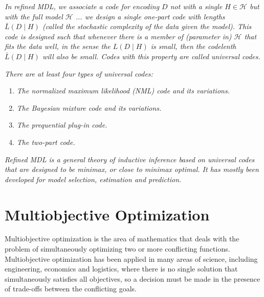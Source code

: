 {\emph{In refined MDL, we associate a code for encoding $D$ not with
    a single $H\in\mathcal{H}$ but with the full model $\mathcal{H}$
    ... we design a single one-part code with lengths $\bar{L}\left(D\mid H\right)$
    (called the stochastic complexity of the data given the model). This
    code is designed such that whenever there is a member of (parameter
    in) $\mathcal{H}$ that fits the data well, in the sense the $L\left(D\mid H\right)$
    is small, then the codelenth $\bar{L}\left(D\mid H\right)$ will also
    be small. Codes with this property are called universal codes.}

\emph{There are at least four types of universal codes:}
\begin{enumerate}
    \item \emph{The normalized maximum likelihood (NML) code and its variations.}
    \item \emph{The Bayesian mixture code and its variations.}
    \item \emph{The prequential plug-in code.}
    \item \emph{The two-part code.}
\end{enumerate}
\emph{Refined MDL is a general theory of inductive inference based
    on universal codes that are designed to be minimax, or close to minimax
    optimal. It has mostly been developed for model selection, estimation
    and prediction.}

%
%

\section{Multiobjective Optimization}
\label{sec:multiobjective_optimization}

Multiobjective optimization is the area of mathematics that deals with the problem of simultaneously optimizing two or more conflicting functions. Multiobjective optimization has been applied in many areas of science, including engineering, economics and logistics, where there is no single solution that simultaneously satisfies all objectives, so a decision must be made in the presence of trade-offs between the conflicting goals.

}
